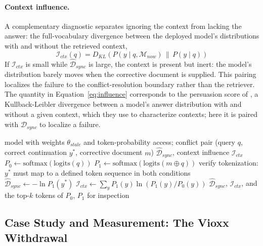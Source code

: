 \documentclass[10pt]{article}
\begin{document}
\paragraph{Context influence.} A complementary diagnostic separates ignoring the context from lacking the answer: the full-vocabulary divergence between the deployed model's distributions with and without the retrieved context,
\begin{equation}
  \label{eq:influence}
  \mathcal{I}_{ctx}(q) = D_{KL}\!\left( P(y \mid q, \mathcal{M}_{now}) \,\|\, P(y \mid q) \right)
\end{equation}
If $\mathcal{I}_{ctx}$ is small while $\widehat{\mathcal{D}}_{sync}$ is large, the context is present but inert: the model's distribution barely moves when the corrective document is supplied. This pairing localizes the failure to the conflict-resolution boundary rather than the retriever. The quantity in Equation~\ref{eq:influence} corresponds to the persuasion score of \citet{du2024context}, a Kullback-Leibler divergence between a model's answer distribution with and without a given context, which they use to characterize contexts; here it is paired with $\widehat{\mathcal{D}}_{sync}$ to localize a failure.

\begin{algorithm}[t]
\caption{$\mathcal{D}_{sync}$ measurement protocol}
\label{alg:dsync}
\begin{algorithmic}[1]
\Require model with weights $\theta_{stale}$ and token-probability access; conflict pair (query $q$, correct continuation $y^*$, corrective document $m$)
\Ensure $\widehat{\mathcal{D}}_{sync}$, context influence $\mathcal{I}_{ctx}$
\State $P_0 \gets \text{softmax}\left(\text{logits}(q)\right)$ 
\State $P_1 \gets \text{softmax}\left(\text{logits}(m \oplus q)\right)$ 
\State verify tokenization: $y^*$ must map to a defined token sequence in both conditions
\State $\widehat{\mathcal{D}}_{sync} \gets -\ln P_1(y^*)$ 
\State $\mathcal{I}_{ctx} \gets \sum_{y} P_1(y) \ln \left( P_1(y) / P_0(y) \right)$ 
\State \Return $\widehat{\mathcal{D}}_{sync}$, $\mathcal{I}_{ctx}$, and the top-$k$ tokens of $P_0$, $P_1$ for inspection
\end{algorithmic}
\end{algorithm}

\subsection{Case Study and Measurement: The Vioxx Withdrawal}
\label{sec:case_study}
\end{document}
